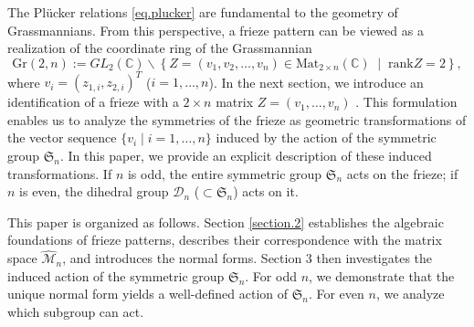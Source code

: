 \documentclass[11pt]{amsart}
\theoremstyle{plain}
\theoremstyle{definition}
\theoremstyle{remark}
\begin{document}

The Plücker relations \eqref{eq.plucker} are fundamental to the geometry of
Grassmannians.
From this perspective, a frieze pattern can be viewed as a realization of the
coordinate ring of the Grassmannian
\begin{equation}
    \mathrm{Gr}(2,n) := GL_2(\mathbb{C})\backslash \left\{ Z=(v_1, v_2, \dots, v_n) \in \mathrm{Mat}_{2 \times n}(\mathbb{C}) \;\middle|\; \mathrm{rank}{Z}=2 \right\},
\end{equation}
where $v_i=(z_{1,i},z_{2,i})^T$ ($i=1, \ldots, n$).
In the next section, we introduce an identification 
of a frieze with a $2 \times n$
matrix $Z=(v_1,\dots,v_n)$ \cite{Nisiyama2022}.
This formulation enables us to analyze the symmetries of the frieze as
geometric transformations of the vector sequence
$\{v_i \mid i=1, \ldots, n\}$
induced by the action of the symmetric group $\mathfrak{S}_n$.
In this paper, we provide an explicit description of these induced
transformations.
If $n$ is odd, the entire symmetric group $\mathfrak{S}_n$ acts on the
frieze;
if $n$ is even, the dihedral group $\mathcal{D}_{n}$ ($\subset \mathfrak{S}_n$) acts on it.

This paper is organized as follows.
Section \ref{section.2} establishes the algebraic foundations of frieze
patterns, describes their correspondence with the matrix space $\widehat{\mathcal{M}}_n$, and
introduces the normal forms.
Section 3 then investigates the induced action of the symmetric group
$\mathfrak{S}_n$.
For odd $n$, we demonstrate that the unique normal form yields a
well-defined action of $\mathfrak{S}_n$.
For even $n$, we analyze which subgroup can act.
\end{document}
